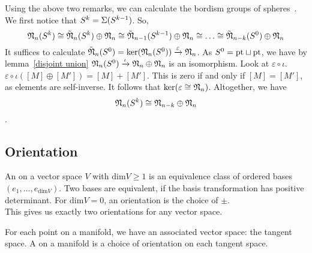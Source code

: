 \documentclass[a4paper,11pt]{article}
\begin{document}
Using the above two remarks, we can calculate the bordism groups of spheres\ \cite[Proposition 6.1]{zhang}. We first notice that \(S^k=\Sigma(S^{k-1})\). So,
\[\mathfrak{N}_n(S^k)\cong\tilde{\mathfrak{N}}_n(S^k)\oplus\mathfrak{N}_n\cong\tilde{\mathfrak{N}}_{n-1}(S^{k-1})\oplus\mathfrak{N}_n\cong\dots\cong\tilde{\mathfrak{N}}_{n-k}(S^0)\oplus\mathfrak{N}_n\]
It suffices to calculate \(\tilde{\mathfrak{N}}_n(S^0)=\ker(\mathfrak{N}_n(S^0))\xrightarrow{\varepsilon}\mathfrak{N}_n\). As \(S^0=\mathrm{pt}\sqcup\mathrm{pt}\), we have by lemma\ \ref{disjoint union} \(\mathfrak{N}_n(S^0)\xrightarrow{\iota}\mathfrak{N}_n\oplus\mathfrak{N}_n\) is an isomorphism. 
Look at \(\varepsilon\circ\iota\). \(\varepsilon\circ\iota([M]\oplus[M'])=[M]+[M']\). This is zero if and only if \([M]=[M']\), as elements are self-inverse. It follows that \(\ker(\varepsilon\cong\mathfrak{N}_n)\). 
Altogether, we have \[\mathfrak{N}_n(S^k)\cong\mathfrak{N}_{n-k}\oplus\mathfrak{N}_n\].

\subsection{Orientation}


\begin{definition}
    An  on a vector space \(V\) with \(\mathrm{dim} V\geq 1\) is an equivalence class of ordered bases \((e_1,\dots,e_{\mathrm{dim}V})\). Two bases are equivalent, if the basis transformation has positive determinant. For \(\mathrm{dim}V=0\), an orientation is the choice of \(\pm\).\\
    This gives us exactly two orientations for any vector space.
\end{definition}

\begin{definition}
    For each point on a manifold, we have an associated vector space: the tangent space. A  on a manifold is a choice of orientation on each tangent space.
\end{definition}

\end{document}
